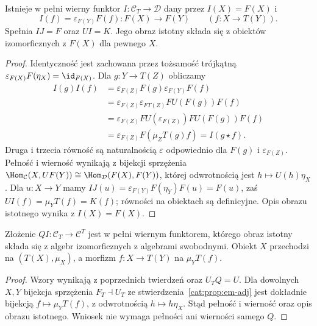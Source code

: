 \begin{twierdzenie}\label{cat:thm:kleisli-comparison}
Istnieje w pełni wierny funktor $I:\mathcal C_T\to\mathcal D$ dany przez $I(X)=F(X)$ i
\[
 I(f)=\varepsilon_{F(Y)}F(f):F(X)\to F(Y)
 \qquad(f:X\to T(Y)).
\]
Spełnia $IJ=F$ oraz $UI=K$. Jego obraz istotny składa się z obiektów izomorficznych z $F(X)$ dla pewnego $X$.
\end{twierdzenie}
\begin{proof}
Identyczność jest zachowana przez tożsamość trójkątną $\varepsilon_{F(X)}F(\eta_X)=\id_{F(X)}$. Dla $g:Y\to T(Z)$ obliczamy
\begin{align*}
 I(g)I(f)
 &=\varepsilon_{F(Z)}F(g)\varepsilon_{F(Y)}F(f)\\
 &=\varepsilon_{F(Z)}\varepsilon_{FT(Z)}FU(F(g))F(f)\\
 &=\varepsilon_{F(Z)}FU(\varepsilon_{F(Z)})FU(F(g))F(f)\\
 &=\varepsilon_{F(Z)}F(\mu_Z T(g)f)=I(g\star f).
\end{align*}
Druga i trzecia równość są naturalnością $\varepsilon$ odpowiednio dla $F(g)$ i $\varepsilon_{F(Z)}$. Pełność i wierność wynikają z bijekcji sprzężenia $\Hom_{\mathcal C}(X,UF(Y))\cong\Hom_{\mathcal D}(F(X),F(Y))$, której odwrotnością jest $h\mapsto U(h)\eta_X$. Dla $u:X\to Y$ mamy $IJ(u)=\varepsilon_{F(Y)}F(\eta_Y)F(u)=F(u)$, zaś $UI(f)=\mu_Y T(f)=K(f)$; równości na obiektach są definicyjne. Opis obrazu istotnego wynika z $I(X)=F(X)$.
\end{proof}

\begin{wniosek}\label{cat:cor:free-algebra-comparison}
Złożenie $QI:\mathcal C_T\to\mathcal C^T$ jest w pełni wiernym funktorem, którego obraz istotny składa się z algebr izomorficznych z algebrami swobodnymi. Obiekt $X$ przechodzi na $(T(X),\mu_X)$, a morfizm $f:X\to T(Y)$ na $\mu_Y T(f)$.
\end{wniosek}
\begin{proof}
Wzory wynikają z poprzednich twierdzeń oraz $U_TQ=U$. Dla dowolnych $X,Y$ bijekcja sprzężenia $F_T\dashv U_T$ ze stwierdzenia~\ref{cat:prop:em-adj} jest dokładnie bijekcją $f\mapsto\mu_YT(f)$, z odwrotnością $h\mapsto h\eta_X$. Stąd pełność i wierność oraz opis obrazu istotnego. Wniosek nie wymaga pełności ani wierności samego $Q$.
\end{proof}


